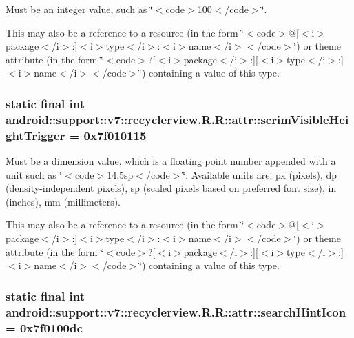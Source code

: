 Must be an \hyperlink{classandroid_1_1support_1_1v7_1_1recyclerview_1_1_r_1_1integer}{integer} value, such as \char`\"{}$<$code$>$100$<$/code$>$\char`\"{}. 

This may also be a reference to a resource (in the form \char`\"{}$<$code$>$@\mbox{[}$<$i$>$package$<$/i$>$:\mbox{]}$<$i$>$type$<$/i$>$:$<$i$>$name$<$/i$>$$<$/code$>$\char`\"{}) or theme attribute (in the form \char`\"{}$<$code$>$?\mbox{[}$<$i$>$package$<$/i$>$:\mbox{]}\mbox{[}$<$i$>$type$<$/i$>$:\mbox{]}$<$i$>$name$<$/i$>$$<$/code$>$\char`\"{}) containing a value of this type. \hypertarget{classandroid_1_1support_1_1v7_1_1recyclerview_1_1_r_1_1attr_8c2664dd868d9e39b4cc1fd4acba5f94}{
\subsubsection[{scrimVisibleHeightTrigger}]{\setlength{\rightskip}{0pt plus 5cm}static final int android::support::v7::recyclerview.R.R::attr::scrimVisibleHeightTrigger = 0x7f010115}}
\label{classandroid_1_1support_1_1v7_1_1recyclerview_1_1_r_1_1attr_8c2664dd868d9e39b4cc1fd4acba5f94}


Must be a dimension value, which is a floating point number appended with a unit such as \char`\"{}$<$code$>$14.5sp$<$/code$>$\char`\"{}. Available units are: px (pixels), dp (density-independent pixels), sp (scaled pixels based on preferred font size), in (inches), mm (millimeters). 

This may also be a reference to a resource (in the form \char`\"{}$<$code$>$@\mbox{[}$<$i$>$package$<$/i$>$:\mbox{]}$<$i$>$type$<$/i$>$:$<$i$>$name$<$/i$>$$<$/code$>$\char`\"{}) or theme attribute (in the form \char`\"{}$<$code$>$?\mbox{[}$<$i$>$package$<$/i$>$:\mbox{]}\mbox{[}$<$i$>$type$<$/i$>$:\mbox{]}$<$i$>$name$<$/i$>$$<$/code$>$\char`\"{}) containing a value of this type. \hypertarget{classandroid_1_1support_1_1v7_1_1recyclerview_1_1_r_1_1attr_92d2d14ffee9571d2333a2aeff21613e}{
\subsubsection[{searchHintIcon}]{\setlength{\rightskip}{0pt plus 5cm}static final int android::support::v7::recyclerview.R.R::attr::searchHintIcon = 0x7f0100dc}}
\label{classandroid_1_1support_1_1v7_1_1recyclerview_1_1_r_1_1attr_92d2d14ffee9571d2333a2aeff21613e}


